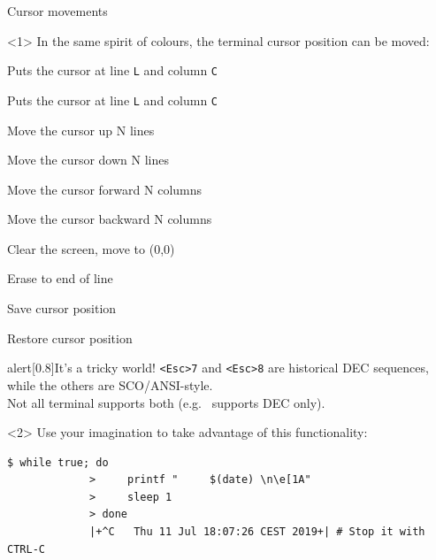 \begin{frame}[fragile]{Cursor movements}
    \begin{onlyenv}<1>
        In the same spirit of colours, the terminal cursor position can be moved:
        \smallskip
        \begin{description}
            {\item[\texttt{<Esc>[<L>;<C>H}] Puts the cursor at line \texttt{L} and column \texttt{C}
            \item[\texttt{<Esc>[<L>;<C>f}] Puts the cursor at line \texttt{L} and column \texttt{C}
            \item[\texttt{<Esc>[<N>A}] Move the cursor up N lines
            \item[\texttt{<Esc>[<N>B}] Move the cursor down N lines
            \item[\texttt{<Esc>[<N>C}] Move the cursor forward N columns
            \item[\texttt{<Esc>[<N>D}] Move the cursor backward N columns
            \item[\texttt{<Esc>[2J}] Clear the screen, move to (0,0)
            \item[\texttt{<Esc>[K}] Erase to end of line
            \item[\texttt{<Esc>[s} \textcolor{TEXT}{or} \texttt{<Esc>7}] Save cursor position
            \item[\texttt{<Esc>[u} \textcolor{TEXT}{or} \texttt{<Esc>8}] Restore cursor position}
        \end{description}
        \PrepareURLsymbol[PB]
        \begin{varblock}{alert}[0.8\textwidth]{It's a tricky world!}
            \scriptsize
            \texttt{<Esc>7} and \texttt{<Esc>8} are historical DEC sequences, while the others are SCO/ANSI-style.\\
            Not all terminal supports both (e.g.\  supports DEC only).
        \end{varblock}
    \end{onlyenv}
    \begin{onlyenv}<2>
        Use your imagination to take advantage of this functionality:
        \medskip
        \begin{lstlisting}[style=MyBash, numbers=none, xleftmargin=3mm, xrightmargin=3mm]
             $ while true; do
             >     printf "     $(date) \n\e[1A"
             >     sleep 1
             > done
             |+^C   Thu 11 Jul 18:07:26 CEST 2019+| # Stop it with CTRL-C


\end{lstlisting}
\end{onlyenv}
\end{frame}
